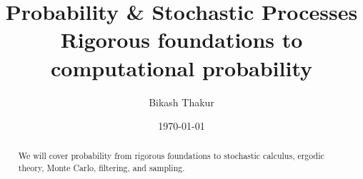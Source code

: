 \documentclass[11pt]{article}
\title{%
{\sffamily\huge\bfseries\color{DarkNavy} Probability \& Stochastic Processes}\\[6pt]
{\sffamily\large\color{AccentGray} Rigorous foundations to computational probability}
}
\author{{\sffamily Bikash Thakur}}
\date{{\sffamily\small\color{AccentGray} \today}}
\begin{document}
\pagecolor{OffWhite}
\color{DarkNavy}

\maketitle
\thispagestyle{plain}

\begin{abstract}
\noindent
We will cover probability from rigorous foundations to stochastic calculus, ergodic theory, Monte Carlo, filtering, and sampling.
\end{abstract}

\tableofcontents
\newpage



\printindex
\end{document}
